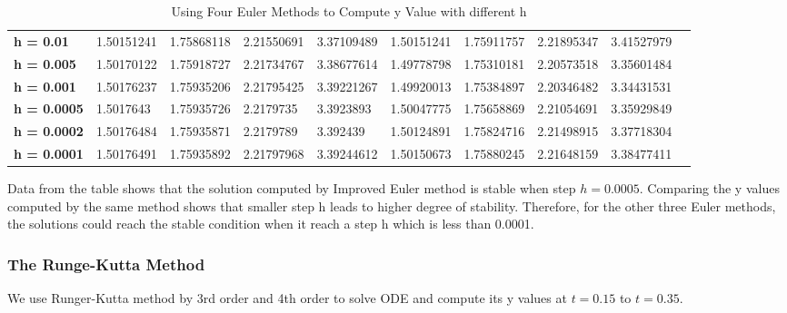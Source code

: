 \documentclass[a4paper]{article}
\begin{document}
\begin{table}[H]
{\begin{tabular}{@{}llllllllll@{}}
    \hline
    \textbf{h = 0.01}   & 1.50151241        & 1.75868118       & 2.21550691       & 3.37109489       & 1.50151241        & 1.75911757       & 2.21895347        & 3.41527979                                                \\
    \textbf{h = 0.005}  & 1.50170122        & 1.75918727       & 2.21734767        & 3.38677614       & 1.49778798        & 1.75310181       & 2.20573518        & 3.35601484                                                  \\
    \textbf{h = 0.001}  & 1.50176237        & 1.75935206       & 2.21795425        & 3.39221267       & 1.49920013        & 1.75384897       & 2.20346482        & 3.34431531                                                  \\
    \textbf{h = 0.0005} & 1.5017643         & 1.75935726       & 2.2179735         & 3.3923893       & 1.50047775         & 1.75658869       & 2.21054691         & 3.35929849                                                  \\
    \textbf{h = 0.0002} & 1.50176484        & 1.75935871       & 2.2179789        & 3.392439       & 1.50124891        & 1.75824716       & 2.21498915        & 3.37718304                                                  \\
    \textbf{h = 0.0001} & 1.50176491        & 1.75935892       & 2.21797968        & 3.39244612       & 1.50150673        & 1.75880245       & 2.21648159        & 3.38477411      \\ 
    \bottomrule
    \end{tabular}%
      }
    \caption{Using Four Euler Methods to Compute y Value with different h }
    \label{tab:IVP2_Euler1}
    \end{table}

    Data from the table shows that the solution computed by Improved Euler method is stable when step $h = 0.0005$. Comparing the y values computed by the same method shows that smaller step h leads to higher degree of stability. Therefore, for the other three Euler methods, the solutions could reach the stable condition when it reach a step h which is less than 0.0001. 

    \subsubsection{The Runge-Kutta Method}
    
    We use Runger-Kutta method by 3rd order and 4th order to solve ODE and compute its y values at $t = 0.15$ to $t = 0.35$. 
    
\end{document}
